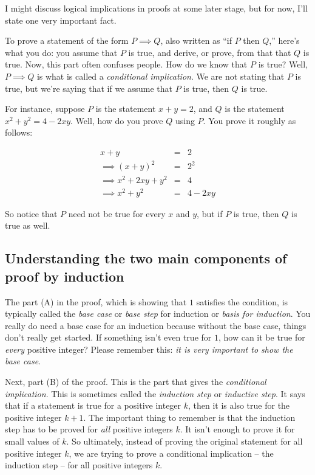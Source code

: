 \documentclass{amsart}
\begin{document}
I might discuss logical implications in proofs at some later stage,
but for now, I'll state one very important fact.

To prove a statement of the form $P \implies Q$, also written as ``if
$P$ then $Q$,'' here's what you do: you assume that $P$ is true, and
derive, or prove, from that that $Q$ is true. Now, this part often
confuses people. How do we know that $P$ is true? Well, $P \implies Q$
is what is called a {\em conditional implication}. We are not stating
that $P$ is true, but we're saying that if we assume that $P$ is true,
then $Q$ is true.

For instance, suppose $P$ is the statement $x + y = 2$, and $Q$ is the
statement $x^2 + y^2 = 4 - 2xy$. Well, how do you prove $Q$ using
$P$. You prove it roughly as follows:

\begin{eqnarray*}
  x + y & = & 2\\
  \implies (x + y)^2 & = & 2^2 \\
  \implies x^2 + 2xy + y^2 & = & 4\\
  \implies x^2 + y^2 & = & 4 - 2xy
\end{eqnarray*}

So notice that $P$ need not be true for every $x$ and $y$, but if $P$
is true, then $Q$ is true as well.

\subsection{Understanding the two main components of proof by induction}

The part (A) in the proof, which is showing that $1$ satisfies the
condition, is typically called the {\em base case} or {\em base step}
for induction or {\em basis for induction}. You really do need a base
case for an induction because without the base case, things don't
really get started. If something isn't even true for $1$, how can it
be true for {\em every} positive integer? Please remember this: {\em
it is very important to show the base case}.

Next, part (B) of the proof. This is the part that gives the {\em
conditional implication}. This is sometimes called the {\em induction
step} or {\em inductive step}. It says that if a statement is true for
a positive integer $k$, then it is also true for the positive integer
$k + 1$. The important thing to remember is that the induction step
has to be proved for {\em all} positive integers $k$. It isn't enough
to prove it for small values of $k$. So ultimately, instead of proving
the original statement for all positive integer $k$, we are trying to
prove a conditional implication -- the induction step -- for all
positive integers $k$.
\end{document}
